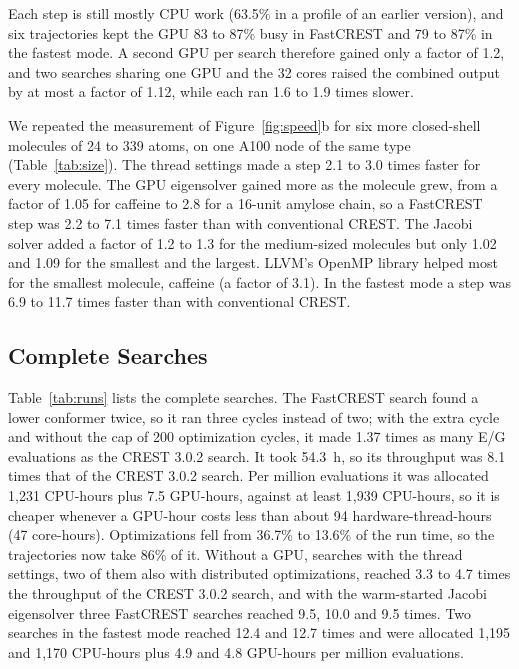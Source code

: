 \documentclass[journal=jctcce,manuscript=article]{achemso}
\begin{document}
Each step is still mostly CPU work (63.5\% in a profile of an earlier version), and six trajectories kept the GPU 83 to 87\% busy in FastCREST and 79 to 87\% in the fastest mode. A second GPU per search therefore gained only a factor of 1.2, and two searches sharing one GPU and the 32 cores raised the combined output by at most a factor of 1.12, while each ran 1.6 to 1.9 times slower.

We repeated the measurement of Figure~\ref{fig:speed}b for six more closed-shell molecules of 24 to 339 atoms, on one A100 node of the same type (Table~\ref{tab:size}). The thread settings made a step 2.1 to 3.0 times faster for every molecule. The GPU eigensolver gained more as the molecule grew, from a factor of 1.05 for caffeine to 2.8 for a 16-unit amylose chain, so a FastCREST step was 2.2 to 7.1 times faster than with conventional CREST. The Jacobi solver added a factor of 1.2 to 1.3 for the medium-sized molecules but only 1.02 and 1.09 for the smallest and the largest. LLVM's OpenMP library helped most for the smallest molecule, caffeine (a factor of 3.1). In the fastest mode a step was 6.9 to 11.7 times faster than with conventional CREST.

\subsection{Complete Searches}
\label{sec:perf}

Table~\ref{tab:runs} lists the complete searches. The FastCREST search found a lower conformer twice, so it ran three cycles instead of two; with the extra cycle and without the cap of 200 optimization cycles, it made 1.37 times as many E/G evaluations as the CREST 3.0.2 search. It took 54.3~h, so its throughput was 8.1 times that of the CREST 3.0.2 search. Per million evaluations it was allocated 1,231 CPU-hours plus 7.5 GPU-hours, against at least 1,939 CPU-hours, so it is cheaper whenever a GPU-hour costs less than about 94 hardware-thread-hours (47 core-hours). Optimizations fell from 36.7\% to 13.6\% of the run time, so the trajectories now take 86\% of it. Without a GPU, searches with the thread settings, two of them also with distributed optimizations, reached 3.3 to 4.7 times the throughput of the CREST 3.0.2 search, and with the warm-started Jacobi eigensolver three FastCREST searches reached 9.5, 10.0 and 9.5 times. Two searches in the fastest mode reached 12.4 and 12.7 times and were allocated 1,195 and 1,170 CPU-hours plus 4.9 and 4.8 GPU-hours per million evaluations.
\end{document}
